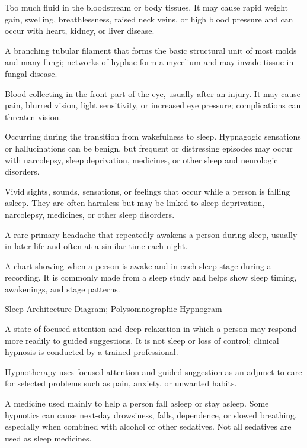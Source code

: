  Too much fluid in the bloodstream or body tissues. It may cause rapid weight gain, swelling, breathlessness, raised neck veins, or high blood pressure and can occur with heart, kidney, or liver disease.

 A branching tubular filament that forms the basic structural unit of most molds and many fungi; networks of hyphae form a mycelium and may invade tissue in fungal disease.

 Blood collecting in the front part of the eye, usually after an injury. It may cause pain, blurred vision, light sensitivity, or increased eye pressure; complications can threaten vision.

 Occurring during the transition from wakefulness to sleep. Hypnagogic sensations or hallucinations can be benign, but frequent or distressing episodes may occur with narcolepsy, sleep deprivation, medicines, or other sleep and neurologic disorders.

 Vivid sights, sounds, sensations, or feelings that occur while a person is falling asleep. They are often harmless but may be linked to sleep deprivation, narcolepsy, medicines, or other sleep disorders.

 A rare primary headache that repeatedly awakens a person during sleep, usually in later life and often at a similar time each night.

 A chart showing when a person is awake and in each sleep stage during a recording. It is commonly made from a sleep study and helps show sleep timing, awakenings, and stage patterns.

\synonyms
Sleep Architecture Diagram; Polysomnographic Hypnogram

 A state of focused attention and deep relaxation in which a person may respond more readily to guided suggestions. It is not sleep or loss of control; clinical hypnosis is conducted by a trained professional.

 Hypnotherapy uses focused attention and guided suggestion as an adjunct to care for selected problems such as pain, anxiety, or unwanted habits.

 A medicine used mainly to help a person fall asleep or stay asleep. Some hypnotics can cause next-day drowsiness, falls, dependence, or slowed breathing, especially when combined with alcohol or other sedatives. Not all sedatives are used as sleep medicines.

